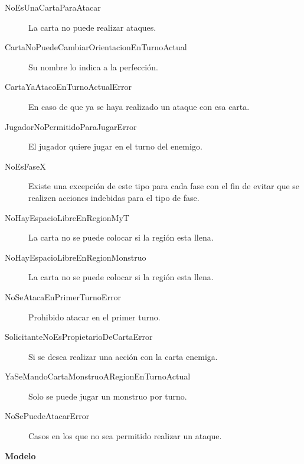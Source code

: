 \begin{description}


\item[NoEsUnaCartaParaAtacar] La carta no puede realizar ataques.

\item[CartaNoPuedeCambiarOrientacionEnTurnoActual] Su nombre lo indica a la perfección.

\item[CartaYaAtacoEnTurnoActualError] En caso de que ya se haya realizado un ataque con esa carta.

\item[JugadorNoPermitidoParaJugarError] El jugador quiere jugar en el turno del enemigo.

\item[NoEsFaseX] Existe una excepción de este tipo para cada fase con el fin de evitar que se realizen acciones indebidas para el tipo de fase.

\item[NoHayEspacioLibreEnRegionMyT] La carta no se puede colocar si la región esta llena.

\item[NoHayEspacioLibreEnRegionMonstruo] La carta no se puede colocar si la región esta llena.

\item[NoSeAtacaEnPrimerTurnoError] Prohibido atacar en el primer turno.

\item[SolicitanteNoEsPropietarioDeCartaError] Si se desea realizar una acción con la carta enemiga.

\item[YaSeMandoCartaMonstruoARegionEnTurnoActual] Solo se puede jugar un monstruo por turno.

\item[NoSePuedeAtacarError] Casos en los que no sea permitido realizar un ataque.

\end{description}

\bigskip

{\large \raggedright \textbf{Modelo}}

